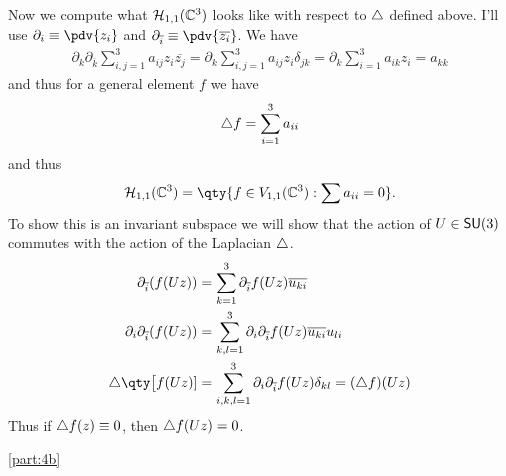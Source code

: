 \documentclass[
	pages,
	boxes,
	color=WildStrawberry
]{homework}
\theoremstyle{plain}
\begin{document}
\begin{solution}
	Now we compute what $\mathcal{H}_{1,1}(\mathbb{C}^3)$ looks like with respect to $\triangle$ defined above. I'll use $\partial_i\equiv \pdv{z_i}$ and $\partial_{\overline{i}}\equiv \pdv{\overline{z_i}}$. We have
	\begin{align*}
		\partial_k \partial_{\overline{k}}\sum_{i,j=1}^3 a_{ij}z_i\overline{z_j} = \partial_k \sum_{i,j=1}^3 a_{ij}z_i\delta_{jk} = \partial_k \sum_{i=1}^3a_{ik}z_i = a_{kk}
	\end{align*}
	and thus for a general element $f$ we have
	\begin{align*}
		\triangle{f} = \sum_{i=1}^3a_{ii}
	\end{align*}
	and thus
	\begin{equation*}
		\mathcal{H}_{1,1}(\C^3) = \qty{f\in V_{1,1}(\C^3) : \sum a_{ii} = 0}.
	\end{equation*}
	To show this is an invariant subspace we will show that the action of $U\in \mathsf{SU}(3)$ commutes with the action of the Laplacian $\triangle$.
	\begin{align*}
		\partial_{\overline{i}}(f(Uz))           & = \sum_{k = 1}^3 \partial_{\overline{i}}f(Uz)\overline{u_{ki}}                              \\
		\partial_i\partial_{\overline{i}}(f(Uz)) & = \sum_{k, l = 1}^3\partial_i\partial_{\overline{i}}f(Uz)\overline{u_{ki}}u_{li}            \\
		\laplace{\qty\big[f(Uz)]}                & = \sum_{i, k, l = 1}^3\partial_i\partial_{\overline{i}}f(Uz)\delta_{kl} = (\laplace{f})(Uz)
	\end{align*}
	Thus if $\triangle{f}(z)\equiv 0$, then $\triangle{f(Uz)} = 0$.


	\ref{part:4b}

\end{solution}
\end{document}
